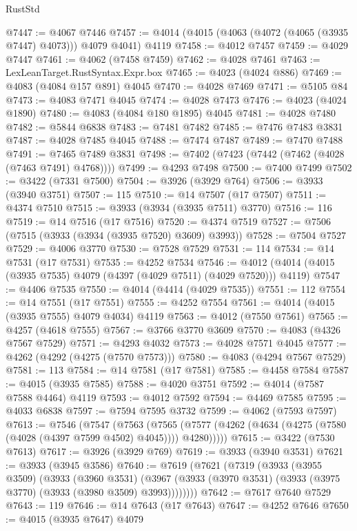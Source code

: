 \begin{lexlean}{RustStd}
\begin{coremodule}
@7447 := @4067 @7446
@7457 := @4014 (@4015 (@4063 (@4072 (@4065 (@3935 @7447) @4073))) @4079 @4041) @4119
@7458 := @4012 @7457
@7459 := @4029 @7447
@7461 := @4062 (@7458 @7459)
@7462 := @4028 @7461
@7463 := LexLeanTarget.RustSyntax.Expr.box
@7465 := @4023 (@4024 @886)
@7469 := @4083 (@4084 @157 @891) @4045
@7470 := @4028 @7469
@7471 := @5105 @84
@7473 := @4083 @7471 @4045
@7474 := @4028 @7473
@7476 := @4023 (@4024 @1890)
@7480 := @4083 (@4084 @180 @1895) @4045
@7481 := @4028 @7480
@7482 := @5844 @6838
@7483 := @7481 @7482
@7485 := @7476 @7483 @3831
@7487 := @4028 @7485 @4045
@7488 := @7474 @7487
@7489 := @7470 @7488
@7491 := @7465 @7489 @3831
@7498 := @7402 (@7423 (@7442 (@7462 (@4028 (@7463 @7491) @4768))))
@7499 := @4293 @7498
@7500 := @7400 @7499
@7502 := @3422 (@7331 @7500)
@7504 := @3926 (@3929 @764)
@7506 := @3933 (@3940 @3751)
@7507 := 115
@7510 := @14 @7507 (@17 @7507)
@7511 := @4374 @7510
@7515 := @3933 (@3934 (@3935 @7511) @3770)
@7516 := 116
@7519 := @14 @7516 (@17 @7516)
@7520 := @4374 @7519
@7527 := @7506 (@7515 (@3933 (@3934 (@3935 @7520) @3609) @3993))
@7528 := @7504 @7527
@7529 := @4006 @3770
@7530 := @7528 @7529
@7531 := 114
@7534 := @14 @7531 (@17 @7531)
@7535 := @4252 @7534
@7546 := @4012 (@4014 (@4015 (@3935 @7535) @4079 (@4397 (@4029 @7511) (@4029 @7520))) @4119)
@7547 := @4406 @7535
@7550 := @4014 (@4414 (@4029 @7535))
@7551 := 112
@7554 := @14 @7551 (@17 @7551)
@7555 := @4252 @7554
@7561 := @4014 (@4015 (@3935 @7555) @4079 @4034) @4119
@7563 := @4012 (@7550 @7561)
@7565 := @4257 (@4618 @7555)
@7567 := @3766 @3770 @3609
@7570 := @4083 (@4326 @7567 @7529)
@7571 := @4293 @4032
@7573 := @4028 @7571 @4045
@7577 := @4262 (@4292 (@4275 (@7570 @7573)))
@7580 := @4083 (@4294 @7567 @7529)
@7581 := 113
@7584 := @14 @7581 (@17 @7581)
@7585 := @4458 @7584
@7587 := @4015 (@3935 @7585)
@7588 := @4020 @3751
@7592 := @4014 (@7587 @7588 @4464) @4119
@7593 := @4012 @7592
@7594 := @4469 @7585
@7595 := @4033 @6838
@7597 := @7594 @7595 @3732
@7599 := @4062 (@7593 @7597)
@7613 := @7546
    (@7547
      (@7563
        (@7565 (@7577 (@4262 (@4634 (@4275 (@7580 (@4028 (@4397 @7599 @4502) @4045)))) @4280)))))
@7615 := @3422 (@7530 @7613)
@7617 := @3926 (@3929 @769)
@7619 := @3933 (@3940 @3531)
@7621 := @3933 (@3945 @3586)
@7640 := @7619
    (@7621
      (@7319
        (@3933
          (@3955 @3509)
          (@3933
            (@3960 @3531)
            (@3967 (@3933 (@3970 @3531) (@3933 (@3975 @3770) (@3933 (@3980 @3509) @3993))))))))
@7642 := @7617 @7640 @7529
@7643 := 119
@7646 := @14 @7643 (@17 @7643)
@7647 := @4252 @7646
@7650 := @4015 (@3935 @7647) @4079

\end{coremodule}
\end{lexlean}
